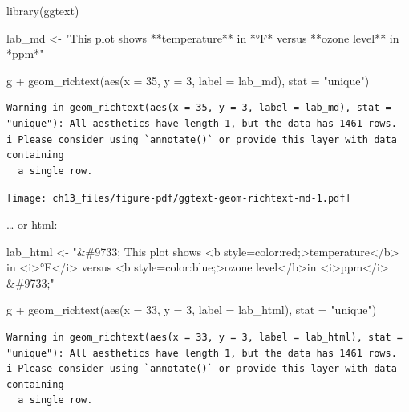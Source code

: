 \documentclass[
  letterpaper,
]{scrbook}
\newenvironment{Shaded}{\begin{snugshade}}{\end{snugshade}}
\newcommand{\AttributeTok}[1]{\textcolor[rgb]{0.40,0.45,0.13}{#1}}
\newcommand{\DecValTok}[1]{\textcolor[rgb]{0.68,0.00,0.00}{#1}}
\newcommand{\FunctionTok}[1]{\textcolor[rgb]{0.28,0.35,0.67}{#1}}
\newcommand{\NormalTok}[1]{\textcolor[rgb]{0.00,0.23,0.31}{#1}}
\newcommand{\OtherTok}[1]{\textcolor[rgb]{0.00,0.23,0.31}{#1}}
\newcommand{\SpecialCharTok}[1]{\textcolor[rgb]{0.37,0.37,0.37}{#1}}
\newcommand{\StringTok}[1]{\textcolor[rgb]{0.13,0.47,0.30}{#1}}
\begin{document}
\begin{Shaded}
\begin{Highlighting}[]
\FunctionTok{library}\NormalTok{(ggtext)}

\NormalTok{lab\_md }\OtherTok{\textless{}{-}} \StringTok{"This plot shows **temperature** in *°F* versus **ozone level** in *ppm*"}

\NormalTok{g }\SpecialCharTok{+}
  \FunctionTok{geom\_richtext}\NormalTok{(}\FunctionTok{aes}\NormalTok{(}\AttributeTok{x =} \DecValTok{35}\NormalTok{, }\AttributeTok{y =} \DecValTok{3}\NormalTok{, }\AttributeTok{label =}\NormalTok{ lab\_md),}
                \AttributeTok{stat =} \StringTok{"unique"}\NormalTok{)}
\end{Highlighting}
\end{Shaded}

\begin{verbatim}
Warning in geom_richtext(aes(x = 35, y = 3, label = lab_md), stat = "unique"): All aesthetics have length 1, but the data has 1461 rows.
i Please consider using `annotate()` or provide this layer with data containing
  a single row.
\end{verbatim}

\texttt{[image: ch13\_files/figure-pdf/ggtext-geom-richtext-md-1.pdf]}

\ldots{} or html:

\begin{Shaded}
\begin{Highlighting}[]
\NormalTok{lab\_html }\OtherTok{\textless{}{-}} \StringTok{"\&\#9733; This plot shows \textless{}b style=\textquotesingle{}color:red;\textquotesingle{}\textgreater{}temperature\textless{}/b\textgreater{} in \textless{}i\textgreater{}°F\textless{}/i\textgreater{} versus \textless{}b style=\textquotesingle{}color:blue;\textquotesingle{}\textgreater{}ozone level\textless{}/b\textgreater{}in \textless{}i\textgreater{}ppm\textless{}/i\textgreater{} \&\#9733;"}

\NormalTok{g }\SpecialCharTok{+}
  \FunctionTok{geom\_richtext}\NormalTok{(}\FunctionTok{aes}\NormalTok{(}\AttributeTok{x =} \DecValTok{33}\NormalTok{, }\AttributeTok{y =} \DecValTok{3}\NormalTok{, }\AttributeTok{label =}\NormalTok{ lab\_html),}
                \AttributeTok{stat =} \StringTok{"unique"}\NormalTok{)}
\end{Highlighting}
\end{Shaded}

\begin{verbatim}
Warning in geom_richtext(aes(x = 33, y = 3, label = lab_html), stat = "unique"): All aesthetics have length 1, but the data has 1461 rows.
i Please consider using `annotate()` or provide this layer with data containing
  a single row.
\end{verbatim}
\end{document}

